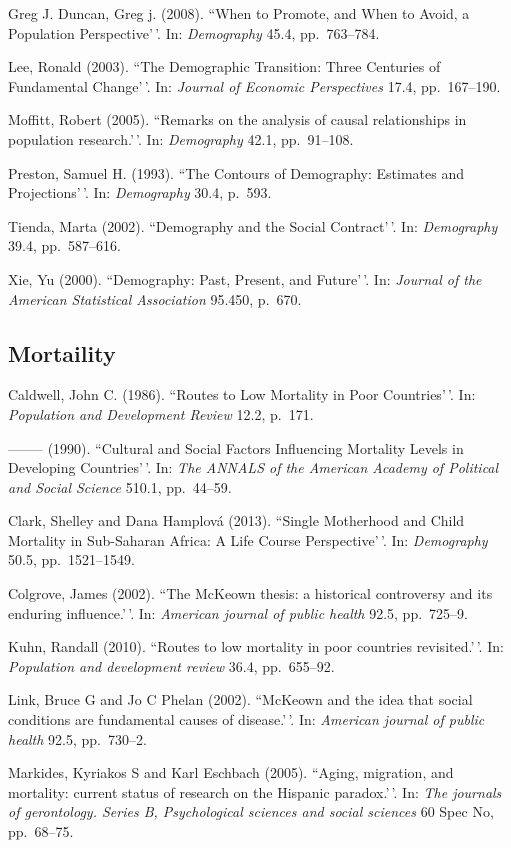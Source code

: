 \documentclass[11pt,]{article}
\begin{document}
Greg J. Duncan, Greg j. (2008). ``When to Promote, and When to Avoid, a
Population Perspective'\,'. In: \emph{Demography} 45.4, pp.~763--784.

Lee, Ronald (2003). ``The Demographic Transition: Three Centuries of
Fundamental Change'\,'. In: \emph{Journal of Economic Perspectives}
17.4, pp.~167--190.

Moffitt, Robert (2005). ``Remarks on the analysis of causal
relationships in population research.'\,'. In: \emph{Demography} 42.1,
pp.~91--108.

Preston, Samuel H. (1993). ``The Contours of Demography: Estimates and
Projections'\,'. In: \emph{Demography} 30.4, p.~593.

Tienda, Marta (2002). ``Demography and the Social Contract'\,'. In:
\emph{Demography} 39.4, pp.~587--616.

Xie, Yu (2000). ``Demography: Past, Present, and Future'\,'. In:
\emph{Journal of the American Statistical Association} 95.450, p.~670.

\hypertarget{mortaility}{%
\subsection{Mortaility}\label{mortaility}}

Caldwell, John C. (1986). ``Routes to Low Mortality in Poor
Countries'\,'. In: \emph{Population and Development Review} 12.2,
p.~171.

-------- (1990). ``Cultural and Social Factors Influencing Mortality
Levels in Developing Countries'\,'. In:
\emph{The ANNALS of the American Academy of Political and Social Science}
510.1, pp.~44--59.

Clark, Shelley and Dana Hamplová (2013). ``Single Motherhood and Child
Mortality in Sub-Saharan Africa: A Life Course Perspective'\,'. In:
\emph{Demography} 50.5, pp.~1521--1549.

Colgrove, James (2002). ``The McKeown thesis: a historical controversy
and its enduring influence.'\,'. In:
\emph{American journal of public health} 92.5, pp.~725--9.

Kuhn, Randall (2010). ``Routes to low mortality in poor countries
revisited.'\,'. In: \emph{Population and development review} 36.4,
pp.~655--92.

Link, Bruce G and Jo C Phelan (2002). ``McKeown and the idea that social
conditions are fundamental causes of disease.'\,'. In:
\emph{American journal of public health} 92.5, pp.~730--2.

Markides, Kyriakos S and Karl Eschbach (2005). ``Aging, migration, and
mortality: current status of research on the Hispanic paradox.'\,'. In:
\emph{The journals of gerontology. Series B, Psychological sciences and social sciences}
60 Spec No, pp.~68--75.
\end{document}
